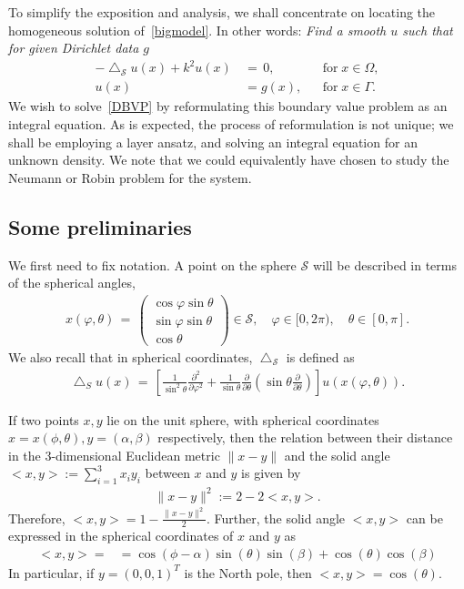 \documentclass[final]{siamltex}
\newcommand{\lap}{\bigtriangleup}
\renewcommand{\S} {\mathcal{S}}
\begin{document}
To simplify the exposition and analysis, we shall concentrate on
locating the homogeneous solution of~\eqref{bigmodel}.  In other words:
{\it Find a smooth $u$ such that for given Dirichlet data $g$}
\begin{subequations}
  \label{DBVP}
  \begin{align}
    -\lap_{\S} u(x) +k^2u(x)\, &= \, 0, &&\mbox{for} \; 
      x \in { \Omega},\\
    u(x) &= g(x), &&\mbox{for} \; x \in \Gamma.
  \end{align}
\end{subequations}
We wish to solve~\eqref{DBVP} by reformulating this boundary value
problem as an integral equation. As is expected, the process of
reformulation is not unique; we shall be employing a layer ansatz, and
solving an integral equation for an unknown density.  We note that we
could equivalently have chosen to study the Neumann or Robin problem
for the system.


\subsection{Some preliminaries }
We first need to fix notation.  A point on the sphere $\S$ will be
described in terms of the spherical angles,
\begin{align*}
  x(\varphi,\theta) \, = \, \left( 
  \begin{array}{c}
    \cos \varphi \sin \theta \\
    \sin \varphi \sin \theta \\
    \cos \theta
  \end{array} 
  \right) \in{\S}, \quad \varphi \in [0,2\pi), 
    \quad \theta \in [0,\pi].
\end{align*}
We also recall that in spherical coordinates, $\lap_\S$ is defined as
\begin{align*}
  \lap_S u(x) \, = \, \left[
  \frac{1}{\sin^2 \theta} \frac{\partial^2}{\partial \varphi^2} +
  \frac{1}{\sin \theta} \frac{\partial}{\partial \theta}
  \left(\sin \theta \frac{\partial}{ \partial \theta}\right)
  \right] u(x(\varphi,\theta)).
\end{align*}

If two points $x,y$ lie on the unit sphere, with
spherical coordinates $x=x(\phi,\theta), y=(\alpha,\beta)$ respectively, then the relation between their distance in the 3-dimensional Euclidean metric
$\|x-y\|$ and the solid angle $<x,y>:= \sum_{i=1}^3 x_iy_i$ between $x$ and $y$ is given
by 
\begin{align*}
  \|x-y\|^2:=
  2-2<x,y>.
\end{align*}
Therefore, $
<x,y>= 1-\frac{\|x-y\|^2}{2}.
$
Further, the solid angle $<x,y>$ can be expressed in the spherical
coordinates of $x$ and $y$ as
\begin{align*}
  <x,y> =  
  &= \cos(\phi-\alpha)\sin(\theta)\sin(\beta)+\cos(\theta)\cos(\beta)
\end{align*} In particular, if $y=(0,0,1)^T$ is the North pole, then $<x,y>=\cos(\theta)$. 
\end{document}
